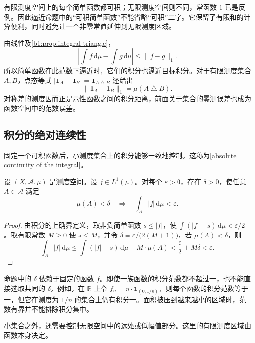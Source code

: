 有限测度空间上的每个简单函数都可积；无限测度空间则不同，常函数 \(1\) 已是反例。因此逼近命题中的“可积简单函数”不能省略“可积”二字。它保留了有限和的计算便利，同时避免让一个非零常值延伸到无限测度区域。

\ProseParagraphBreak

由线性及\cref{b1:prop:integral-triangle}，
\[
\left|\int f\,\mathrm d\mu-\int g\,\mathrm d\mu\right|
\leq\|f-g\|_1.
\]
所以简单函数在此范数下逼近时，它们的积分也逼近目标积分。对于有限测度集合 \(A,B\)，点态等式 \(|\mathbf1_A-\mathbf1_B|=\mathbf1_{A\mathbin{\triangle}B}\) 还给出
\[
\|\mathbf1_A-\mathbf1_B\|_1=\mu(A\mathbin{\triangle}B).
\]
对称差的测度因而正是示性函数之间的积分距离，前面关于集合的零测误差也成为函数空间中的范数误差。

\subsection{积分的绝对连续性}
\label{b1:subsec:050204}

固定一个可积函数后，小测度集合上的积分能够一致地控制。这称为[absolute continuity of the integral]。

\begin{proposition}\label{b1:prop:integral-absolute-continuity}
设 \((X,\mathcal A,\mu)\) 是测度空间。设 \(f\in L^1(\mu)\)。对每个 \(\varepsilon>0\)，存在 \(\delta>0\)，使任意 \(A\in\mathcal A\) 满足
\[
\mu(A)<\delta\quad\Longrightarrow\quad\int_A|f|\,\mathrm d\mu<\varepsilon.
\]
\end{proposition}
\begin{proof}
由积分的上确界定义，取非负简单函数 \(s\leq|f|\)，使 \(\int(|f|-s)\,\mathrm d\mu<\varepsilon/2\)。取有限常数 \(M\geq0\) 使 \(s\leq M\)，并令 \(\delta=\varepsilon/\bigl(2(M+1)\bigr)\)。若 \(\mu(A)<\delta\)，则
\[
\int_A|f|\,\mathrm d\mu
\leq\int(|f|-s)\,\mathrm d\mu+M\cdot\mu(A)
<\frac\varepsilon2+M\delta<\varepsilon.
\]
\end{proof}

命题中的 \(\delta\) 依赖于固定的函数 \(f\)。即使一族函数的积分范数都不超过一，也不能直接选取共同的 \(\delta\)。例如，在 \(\mathbb R\) 上令 \(f_n=n\cdot\mathbf1_{(0,1/n)}\)，则每个函数的积分范数等于一，但它在测度为 \(1/n\) 的集合上仍有积分一。面积被压到越来越小的区域时，范数有界并不能排除积分集中。

\ProseParagraphBreak

小集合之外，还需要控制无限空间中的远处或低幅值部分。这里的有限测度区域由函数本身决定。

